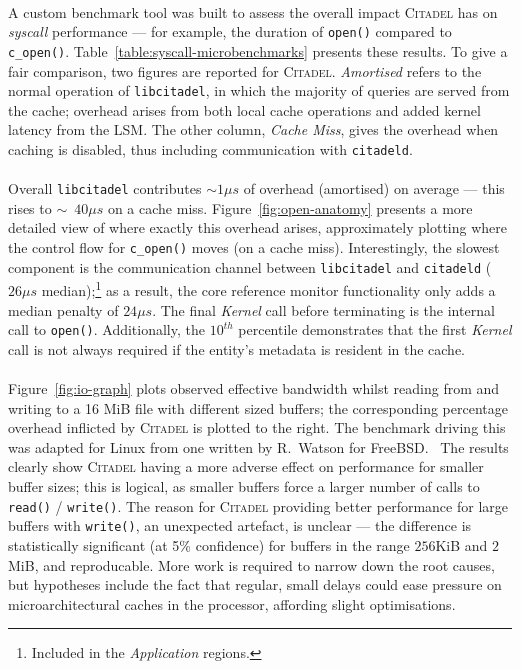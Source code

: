 \paragraph{} A custom benchmark tool was built to assess the overall impact \textsc{Citadel} has on \textit{syscall} performance --- for example, the duration of \texttt{open()} compared to \texttt{c\_open()}. Table~\ref{table:syscall-microbenchmarks} presents these results. To give a fair comparison, two figures are reported for \textsc{Citadel}. \textit{Amortised} refers to the normal operation of \texttt{libcitadel}, in which the majority of queries are served from the cache; overhead arises from both local cache operations and added kernel latency from the LSM. The other column, \textit{Cache Miss}, gives the overhead when caching is disabled, thus including communication with \texttt{citadeld}.

\paragraph{} Overall \texttt{libcitadel} contributes $\sim{}1 \mu s$ of overhead (amortised) on average --- this rises to $\sim$~$40 \mu s$ on a cache miss. Figure~\ref{fig:open-anatomy} presents a more detailed view of where exactly this overhead arises, approximately plotting where the control flow for \texttt{c\_open()} moves (on a cache miss). Interestingly, the slowest component is the communication channel between \texttt{libcitadel} and \texttt{citadeld} ($26\mu s$ median);\footnote{Included in the \textit{Application} regions.} as a result, the core reference monitor functionality only adds a median penalty of $24\mu s$. The final \textit{Kernel} call before terminating is the internal call to \texttt{open()}. Additionally, the $10^{th}$ percentile demonstrates that the first \textit{Kernel} call is not always required if the entity's metadata is resident in the cache.

\paragraph{} Figure~\ref{fig:io-graph} plots observed effective bandwidth whilst reading from and writing to a 16 MiB file with different sized buffers; the corresponding percentage overhead inflicted by \textsc{Citadel} is plotted to the right. The benchmark driving this was adapted for Linux from one written by R.~Watson for FreeBSD.~\cite{l41-benchmark} The results clearly show \textsc{Citadel} having a more adverse effect on performance for smaller buffer sizes; this is logical, as smaller buffers force a larger number of calls to \texttt{read()} / \texttt{write()}. The reason for \textsc{Citadel} providing better performance for large buffers with \texttt{write()}, an unexpected artefact, is unclear --- the difference is statistically significant (at 5\% confidence) for buffers in the range $256$KiB and $2$ MiB, and reproducable. More work is required to 
narrow down the root causes, but hypotheses include the fact that regular, small delays could ease pressure on microarchitectural caches in the processor, affording slight optimisations.



